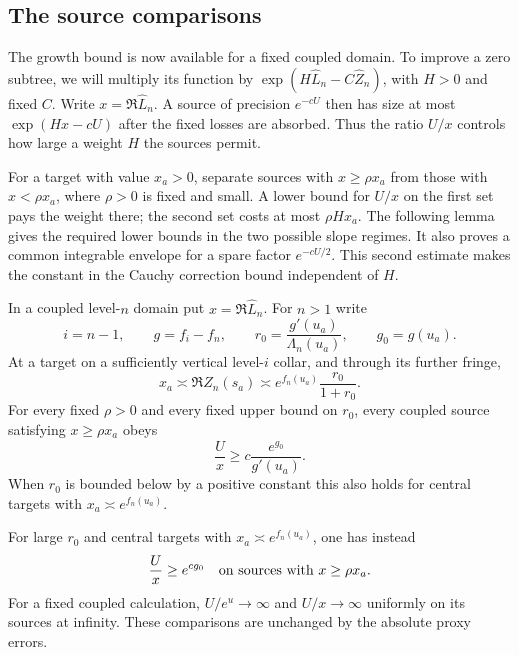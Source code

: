 \subsection{The source comparisons}

The growth bound is now available for a fixed coupled domain.  To
improve a zero subtree, we will multiply its function by
$\exp(H\widehat L_n-C\widehat Z_n)$, with $H>0$ and fixed $C$.
Write $x=\Re\widehat L_n$.  A source of precision $e^{-cU}$ then
has size at most $\exp(Hx-cU)$ after the fixed losses are absorbed.
Thus the ratio $U/x$ controls how large a weight $H$ the sources
permit.

For a target with value $x_a>0$, separate sources with
$x\geq\rho x_a$ from those with $x<\rho x_a$, where $\rho>0$
is fixed and small.  A lower bound for $U/x$ on the first set
pays the weight there; the second set costs at most
$\rho Hx_a$.  The following lemma gives the required lower bounds
in the two possible slope regimes.  It also proves a common
integrable envelope for a spare factor $e^{-cU/2}$.  This second
estimate makes the constant in the Cauchy correction bound independent
of $H$.

\begin{lemma}\label{lem:separation-source-ratios}
In a coupled level-$n$ domain put $x=\Re\widehat L_n$.
For $n>1$ write
\[
 i=n-1,\qquad g=f_i-f_n,\qquad
 r_0=\frac{g'(u_a)}{\Lambda_n(u_a)},\qquad g_0=g(u_a).
\]
At a target on a sufficiently vertical level-$i$ collar, and
through its further fringe,
\begin{equation}\label{eq:separation-target-x}
 x_a\asymp\Re Z_n(s_a)
       \asymp e^{f_n(u_a)}\frac{r_0}{1+r_0}.
\end{equation}
For every fixed $\rho>0$ and every fixed upper bound on $r_0$,
every coupled source satisfying $x\geq\rho x_a$ obeys
\begin{equation}\label{eq:separation-ratio-small}
 \frac{U}{x}\geq c\frac{e^{g_0}}{g'(u_a)}.
\end{equation}
When $r_0$ is bounded below by a positive constant this also holds
for central targets with $x_a\asymp e^{f_n(u_a)}$.

For large $r_0$ and central targets with
$x_a\asymp e^{f_n(u_a)}$, one has instead
\begin{equation}\label{eq:separation-ratio-large}
 \frac{U}{x}\geq e^{c g_0}
 \quad\hbox{on sources with }x\geq\rho x_a.
\end{equation}
For a fixed coupled calculation, $U/e^u\to\infty$ and
$U/x\to\infty$ uniformly on its sources at infinity.
These comparisons are unchanged by the absolute proxy errors.
\end{lemma}

